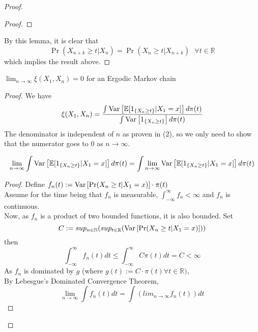 \begin{theorem}
\begin{proof}
\begin{lem}
\begin{proof}
            \end{proof}
        \end{lem}
        By this lemma, it is clear that
        \begin{equation*}
            \Pr (X_{n+k} \geq t | X_n) = \Pr (X_n \geq t | X_{n+k}) \text{  } \forall t \in \mathbb{R}
        \end{equation*}
        which implies the result above.
    \end{proof}
\end{theorem}
    \newpage

\begin{theorem}
    $\lim_{n \rightarrow \infty} \xi(X_1, X_{n}) = 0$ for an Ergodic Markov chain
    \begin{proof}
        We have
        \begin{equation*}
            \xi(X_1, X_{n}) = \frac{\int \text{Var}\left[{{\mathbb{E}[1_{\{X_{n} \geq t\}}|X_1=x]}}\right] d\pi(t)}{\int \text{Var}\left[{{1_{\{X_{n} \geq t\}}}}\right] d\pi(t)}
        \end{equation*}
        The denominator is independent of $n$ as proven in (2), so we only need to show that the numerator goes to 0 as $n \rightarrow \infty$.\\
        \begin{lem}
            $$\lim_{n \rightarrow \infty} \int \text{Var}\left[{{\mathbb{E}[1_{\{X_{n} \geq t\}}|X_1=x]}}\right] d\pi(t) = \int \lim_{n \rightarrow \infty}\text{Var}\left[{{\mathbb{E}[1_{\{X_{n} \geq t\}}|X_1=x]}}\right] d\pi(t)$$
            \begin{proof}
                Define $f_n(t) := \text{Var}\left[{{\Pr(X_{n} \geq t | X_{1} = x)}}\right] \cdot \pi(t) $ \\
                Assume for the time being that $f_n$ is measurable, $\int_{-\infty}^{\infty} f_n < \infty$ and $f_n$ is continuous.\\
                Now, as $f_n$ is a product of two bounded functions, it is also bounded.
                Set
                $$ C:= sup_{n \in \mathbb{N}} (sup_{t \in \mathbb{R}} (\text{Var}\left[{{\Pr(X_{n} \geq t | X_{1} = x)}}\right]))$$
                then
                $$\int_{-\infty}^{\infty} f_n(t)dt \leq \int_{-\infty}^{\infty} C\pi(t)dt = C < \infty$$
                As $f_n$ is dominated by $g$ (where $g(t) := C\cdot\pi(t) \forall t \in \mathbb{R})$, \\
                By Lebesgue's Dominated Convergence Theorem,
                $$\lim_{n \rightarrow \infty} \int f_n(t) dt = \int (lim_{n \rightarrow \infty} f_n(t)) dt$$
            \end{proof}

\end{lem}
\end{proof}
\end{theorem}
